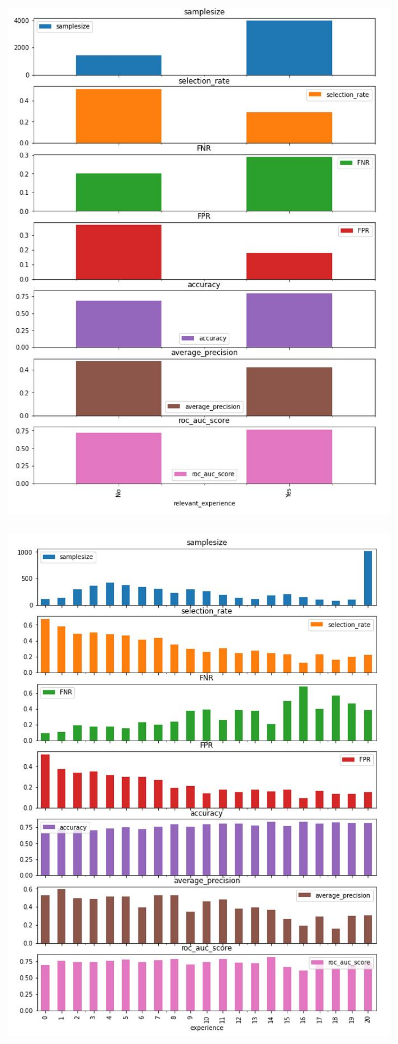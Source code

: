 \begin{figure}
    \centering
\includegraphics[width=0.9\textwidth,height=0.98\textwidth]{relevant_ex.JPG}
    \label{fig: 2}
\end{figure}
\begin{figure}
    \centering
\includegraphics[width=0.9\textwidth,height=0.98\textwidth]{experience.JPG}
    \label{fig: 2}
\end{figure}
